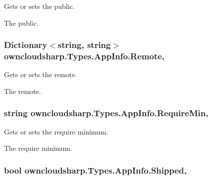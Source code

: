 Gets or sets the public. 

The public.\hypertarget{classowncloudsharp_1_1_types_1_1_app_info_a906b8dbb9f8441c356ba849098b225d5}{}
\subsubsection[{Remote}]{\setlength{\rightskip}{0pt plus 5cm}Dictionary$<$string, string$>$ owncloudsharp.\+Types.\+App\+Info.\+Remote\hspace{0.3cm}{\ttfamily [get]}, {\ttfamily [set]}}\label{classowncloudsharp_1_1_types_1_1_app_info_a906b8dbb9f8441c356ba849098b225d5}


Gets or sets the remote. 

The remote.\hypertarget{classowncloudsharp_1_1_types_1_1_app_info_a4c2f82a1c6fdb0dba49508f8e78b0e66}{}
\subsubsection[{Require\+Min}]{\setlength{\rightskip}{0pt plus 5cm}string owncloudsharp.\+Types.\+App\+Info.\+Require\+Min\hspace{0.3cm}{\ttfamily [get]}, {\ttfamily [set]}}\label{classowncloudsharp_1_1_types_1_1_app_info_a4c2f82a1c6fdb0dba49508f8e78b0e66}


Gets or sets the require minimum. 

The require minimum.\hypertarget{classowncloudsharp_1_1_types_1_1_app_info_a8021265fafbd3d4b628a8f0cc517e50a}{}
\subsubsection[{Shipped}]{\setlength{\rightskip}{0pt plus 5cm}bool owncloudsharp.\+Types.\+App\+Info.\+Shipped\hspace{0.3cm}{\ttfamily [get]}, {\ttfamily [set]}}\label{classowncloudsharp_1_1_types_1_1_app_info_a8021265fafbd3d4b628a8f0cc517e50a}


